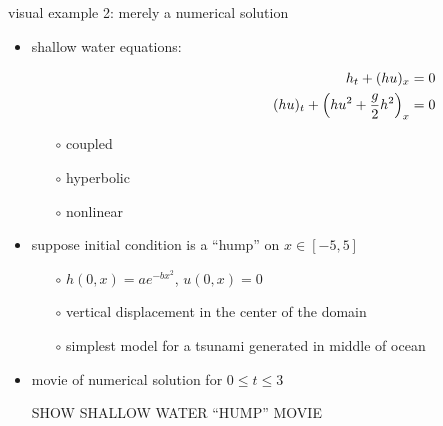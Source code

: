 \documentclass[10pt,dvipsnames,usepdftitle=false,
hyperref={pdftitle = {Finite volume methods},
    pdfauthor = {Ed Bueler}}]{beamer}
\begin{document}
\begin{frame}{visual example 2: merely a numerical solution}

\begin{itemize}
\item shallow water equations:

\vspace{-11.5mm}
\begin{align*}
\hspace{60mm} h_t + (hu)_x &= 0 \\
(hu)_t + \left(h u^2 + \frac{g}{2} h^2\right)_x &= 0
\end{align*}

\vspace{-5mm}
    \begin{itemize}
    \item[$\circ$] coupled
    \item[$\circ$] hyperbolic
    \item[$\circ$] nonlinear
    \end{itemize}
\item suppose initial condition is a ``hump'' on $x \in [-5,5]$
    \begin{itemize}
    \item[$\circ$] $h(0,x)=a e^{-bx^2}$, $u(0,x)=0$
    \item[$\circ$] vertical displacement in the center of the domain
    \item[$\circ$] simplest model for a tsunami generated in middle of ocean
    \end{itemize}
\item movie of numerical solution for $0 \le t \le 3$

\vspace{10mm}
\begin{center}
\alert{SHOW SHALLOW WATER ``HUMP'' MOVIE}
\end{center}

\vspace{10mm}

\end{itemize}
\end{frame}
\end{document}
